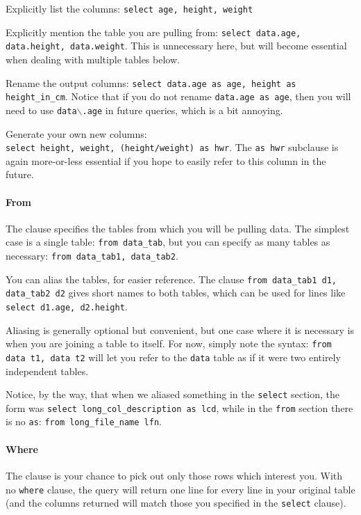 Explicitly list the columns: {\tt select age, height, weight}

Explicitly mention the table you are pulling from: {\tt select data.age,
data.height, data.weight}. This is unnecessary here, but will become
essential when dealing with multiple tables below.

Rename the output columns: {\tt select data.age as age, height as\\
height\_\-in\_\-cm}. Notice that if you do not rename {\tt data.age as 
age}, then you will need to use {\tt data$\backslash$.age} in future
queries, which is a
bit annoying.

Generate your own new columns:\\
{\tt select height, weight, (height/weight) as hwr}.
The {\tt as hwr} subclause is again more-or-less
essential if you hope to easily refer to this column in the future. 

\paragraph{From} The  clause specifies the tables from which
you will be pulling data. The simplest case is a single table: {\tt from
data\_tab}, but you can specify as many tables as necessary: {\tt from
data\_tab1, data\_tab2}. 

You can alias the tables, for easier reference. The clause {\tt from
data\_tab1 d1, data\_tab2 d2} gives short names to both tables, which can
be used for lines like {\tt select d1.age, d2.height}. 

Aliasing is generally optional but convenient, but one case where
it is necessary is when you are joining a table to itself.
For now, simply note the syntax: {\tt from data t1, data t2} will let
you refer to the {\tt data} table as if it were two entirely independent
tables. 

Notice, by the way, that when we aliased something in the {\tt select}
section, the form was {\tt select long\_col\_description as lcd}, while
in the {\tt from} section there is no {\tt as}: {\tt from long\_file\_name lfn}.

\paragraph{Where}
The  clause is your chance to pick out only those rows which
interest you. With no {\tt where} clause, the query will return one line
for every line in your original table (and the columns returned will
match those you specified in the {\tt select} clause).

